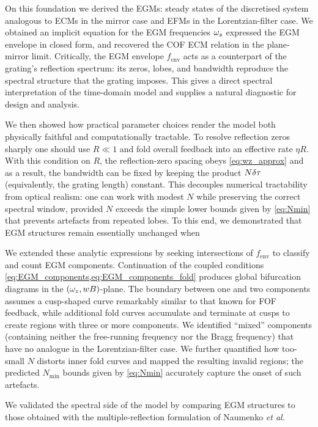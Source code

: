 %
On this foundation we derived the EGMs: steady states of the discretised system analogous to ECMs in the mirror case and EFMs in the Lorentzian-filter case.
We obtained an implicit equation for the EGM frequencies $\omega_s$ expressed the EGM envelope in closed form, and recovered the COF ECM relation in the plane-mirror limit.
Critically, the EGM envelope $f_\text{env}$ acts as a counterpart of the grating’s reflection spectrum: its zeros, lobes, and bandwidth reproduce the spectral structure that the grating imposes.
This gives a direct spectral interpretation of the time-domain model and supplies a natural diagnostic for design and analysis.
%
\par
%
We then showed how practical parameter choices render the model both physically faithful and computationally tractable.
To resolve reflection zeros sharply one should use $R\ll1$ and fold overall feedback into an effective rate $\eta R$.
With this condition on $R$, the reflection-zero spacing obeys \eqref{eq:wz_approx} and as a result, the bandwidth can be fixed by keeping the product $N\delta \tau$ (equivalently, the grating length) constant.
This decouples numerical tractability from optical realism: one can work with modest $N$ while preserving the correct spectral window, provided $N$ exceeds the simple lower bounds given by \eqref{eq:Nmin} that prevents artefacts from repeated lobes.
To this end, we demonstrated that EGM structures remain essentially unchanged when 
%
\par
%
We extended these analytic expressions by seeking intersections of $f_\text{env}$ to classify and count EGM components.
Continuation of the coupled conditions \eqref{eq:EGM_components,eq:EGM_components_fold} produces global bifurcation diagrams in the $(\omega_z,wB)$-plane.
The boundary between one and two components assumes a cusp-shaped curve remarkably similar to that known for FOF feedback, while additional fold curves accumulate and terminate at cusps to create regions with three or more components.
We identified “mixed” components (containing neither the free-running frequency nor the Bragg frequency) that have no analogue in the Lorentzian-filter case.
We further quantified how too-small $N$ distorts inner fold curves and mapped the resulting invalid regions; the predicted $N_\text{min}$ bounds given by \eqref{eq:Nmin} accurately capture the onset of such artefacts.
%
\par
%
We validated the spectral side of the model by comparing EGM structures to those obtained with the multiple-reflection formulation of Naumenko \textit{et al.}
